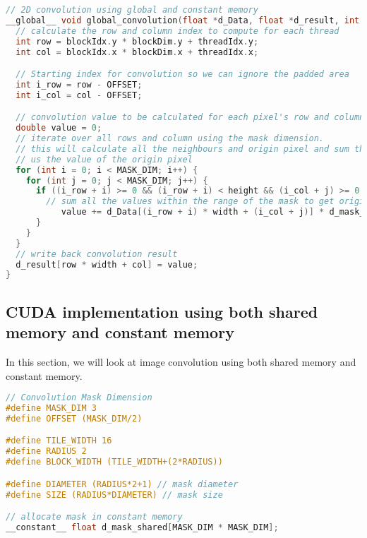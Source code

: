 \begin{lstlisting}[language=C, label={lst: global_convolution}, caption= 2D Convolution using the global memory]
// 2D convolution using global and constant memory
__global__ void global_convolution(float *d_Data, float *d_result, int width, int height) {
  // calculate the row and column index to compute for each thread
  int row = blockIdx.y * blockDim.y + threadIdx.y;
  int col = blockIdx.x * blockDim.x + threadIdx.x;

  // Starting index for convolution so we can ignore the padded area
  int i_row = row - OFFSET;
  int i_col = col - OFFSET;

  // convolution value to be calculated for each pixel's row and column
  double value = 0;
  // iterate over all rows and column using the mask dimension.
  // this will calculate all the neighbours and origin pixel and sum these values to give
  // us the value of the origin pixel
  for (int i = 0; i < MASK_DIM; i++) {
    for (int j = 0; j < MASK_DIM; j++) {
      if ((i_row + i) >= 0 && (i_row + i) < height && (i_col + j) >= 0 && (i_col + j) < width) {
      	// sum all the values within the range of the mask to get origin pixel's value
           value += d_Data[(i_row + i) * width + (i_col + j)] * d_mask_global[i * MASK_DIM + j];
      }
    }
  }
  // write back convolution result
  d_result[row * width + col] = value;
}
\end{lstlisting}


\subsection{CUDA implementation using both shared memory and constant memory}
In this section, we will look at image convolution using both shared memory and constant memory.

\begin{lstlisting}[language=C, label={lst: mask_shared}, caption= Cache mask in to the constant memory]
// Convolution Mask Dimension
#define MASK_DIM 3
#define OFFSET (MASK_DIM/2)

#define TILE_WIDTH 16
#define RADIUS 2
#define BLOCK_WIDTH (TILE_WIDTH+(2*RADIUS))

#define DIAMETER (RADIUS*2+1) // mask diameter
#define SIZE (RADIUS*DIAMETER) // mask size

// allocate mask in constant memory
__constant__ float d_mask_shared[MASK_DIM * MASK_DIM];
\end{lstlisting}


